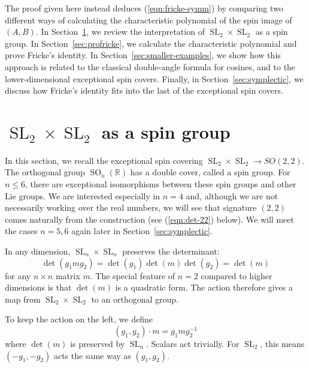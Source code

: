\documentclass[11pt]{amsart}
\theoremstyle{definition}
\numberwithin{figure}{section}
\numberwithin{equation}{section}
\numberwithin{table}{section}
\newcommand{\R}{\mathbb{R}}
\newcommand{\SL}{\operatorname{SL}}
\newcommand{\SO}{\operatorname{SO}}
\begin{document}
The proof given here instead deduces (\ref{eqn:fricke-symm}) by comparing two different ways of calculating the characteristic polynomial of the spin image of $(A,B)$.
In Section~\ref{sec:sl2sl2spin}, we review the interpretation of $\SL_2 \times \SL_2$ as a spin group.
In Section~\ref{sec:profricke}, we calculate the characteristic polynomial and prove Fricke's identity.
In Section~\ref{sec:smaller-examples}, we show how this approach is related to the classical double-angle formula for cosines, and to the lower-dimensional exceptional spin covers.
Finally, in Section~\ref{sec:symplectic}, we discuss how Fricke's identity fits into the last of the exceptional spin covers.

\section{$\SL_2 \times \SL_2$ as a spin group} \label{sec:sl2sl2spin}

In this section, we recall the exceptional spin covering $\SL_2 \times \SL_2 \rightarrow SO(2,2)$.
The orthogonal group $\SO_n(\R)$ has a double cover, called a spin group.
For $n \leq 6$, there are exceptional isomorphisms between these spin groups and other Lie groups.
We are interested especially in $n=4$ and, although we are not necessarily working over the real numbers, we will see that signature $(2,2)$ comes naturally from the construction (see (\ref{eqn:det-22}) below).
We will meet the cases $n=5,6$ again later in Section~\ref{sec:symplectic}.

In any dimension, $\SL_n \times \SL_n$ preserves the determinant:
\[
\det(g_1 m g_2) = \det(g_1) \det(m) \det(g_2) = \det(m)
\]
for any $n\times n$ matrix $m$.
The special feature of $n=2$ compared to higher dimensions is that $\det(m)$ is a quadratic form. The action therefore gives a map from $\SL_2 \times \SL_2$ to an orthogonal group.

To keep the action on the left, we define
\[
(g_1,g_2) \cdot m = g_1 m g_2^{-1}
\]
where $\det(m)$ is preserved by $\SL_n$.
Scalars act trivially.
For $\SL_2$, this means $(-g_1,-g_2)$ acts the same way as $(g_1,g_2)$.
\end{document}
